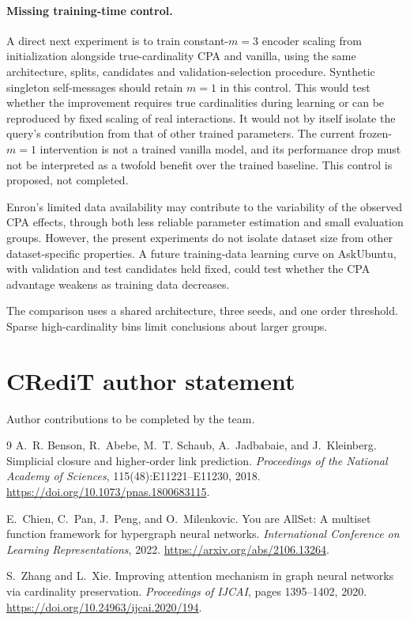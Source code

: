 \documentclass{article}
\begin{document}
\paragraph{Missing training-time control.}
A direct next experiment is to train constant-$m=3$ encoder scaling from initialization alongside true-cardinality CPA and vanilla, using the same architecture, splits, candidates and validation-selection procedure. Synthetic singleton self-messages should retain $m=1$ in this control. This would test whether the improvement requires true cardinalities during learning or can be reproduced by fixed scaling of real interactions. It would not by itself isolate the query's contribution from that of other trained parameters. The current frozen-$m=1$ intervention is not a trained vanilla model, and its performance drop must not be interpreted as a twofold benefit over the trained baseline. This control is proposed, not completed.

Enron's limited data availability may contribute to the variability of the observed CPA effects, through both less reliable parameter estimation and small evaluation groups. However, the present experiments do not isolate dataset size from other dataset-specific properties. A future training-data learning curve on AskUbuntu, with validation and test candidates held fixed, could test whether the CPA advantage weakens as training data decreases.

The comparison uses a shared architecture, three seeds, and one order threshold. Sparse high-cardinality bins limit conclusions about larger groups.

\clearpage
\section{CRediT author statement}
Author contributions to be completed by the team.

\clearpage
\begin{thebibliography}{9}
A.~R. Benson, R.~Abebe, M.~T. Schaub, A.~Jadbabaie, and J.~Kleinberg.
Simplicial closure and higher-order link prediction.
\emph{Proceedings of the National Academy of Sciences}, 115(48):E11221--E11230, 2018.
\url{https://doi.org/10.1073/pnas.1800683115}.

E.~Chien, C.~Pan, J.~Peng, and O.~Milenkovic.
You are AllSet: A multiset function framework for hypergraph neural networks.
\emph{International Conference on Learning Representations}, 2022.
\url{https://arxiv.org/abs/2106.13264}.

S.~Zhang and L.~Xie.
Improving attention mechanism in graph neural networks via cardinality preservation.
\emph{Proceedings of IJCAI}, pages 1395--1402, 2020.
\url{https://doi.org/10.24963/ijcai.2020/194}.
\end{thebibliography}
\end{document}
